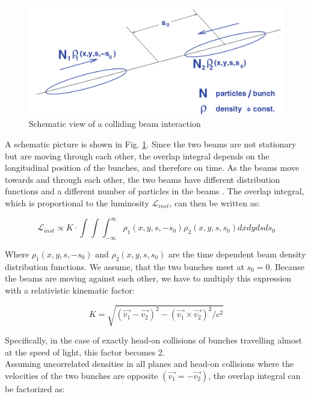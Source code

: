 \begin{center}
  \begin{figure}[h!]
    \centering
\includegraphics[scale=.25]{Chapter1/luminosity.png} 
 \caption[Colliding beam interaction]{Schematic view of a colliding beam interaction\cite{concept_of_luminosity}}
    \label{luminosity}
  \end{figure}
\end{center}

A schematic picture is shown in Fig. \ref{luminosity}. Since the two beams are not stationary but are moving through each other, the overlap integral depends on the longitudinal position of the bunches, and therefore on time. As the beams move towards and through each other, the two beams have different distribution functions and a different number of particles in the beams \cite{concept_of_luminosity}. The overlap integral, which is proportional to the luminosity $\mathcal{L}_{inst}$, can then be written as:
 
\begin{equation}
  \mathcal{L}_{inst}\propto K\cdot \int\int \int_{-\infty}^{\infty} \rho_{1}(x,y,s,-s_{0}) \rho_{2}(x,y,s,s_{0})dxdydsds_{0}
    \label{lumi_1}
\end{equation}
 
Where  $\rho_{1}(x,y,s,-s_{0})$ and $\rho_{2}(x,y,s,s_{0})$ are the time dependent beam density distribution functions. We assume, that the two bunches meet at $s_{0} = 0$. Because the beams are moving against each other, we have to multiply this expression with a relativistic kinematic factor:

\begin{equation}
 K = \sqrt{(\vec{v_{1}}-\vec{v_{2}})^{2}-(\vec{v_{1}}\times \vec{v_{2}})^{2}/c^{2}}
    \label{kinematic}
\end{equation}

Specifically, in the case of exactly head-on collisions of bunches travelling almost at the speed of light, this factor becomes 2.\\
Assuming uncorrelated densities in all planes and head-on collisions where the velocities of the two bunches are opposite $(\vec{v_{1}}=-\vec{v_{2}})$, the overlap integral can be factorized as:


